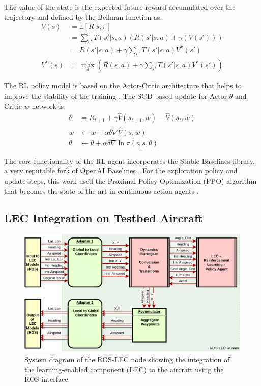 The value of the state is the expected future reward accumulated over the trajectory and defined by the Bellman function as:
\begin{align}
	V(s) &=  \mathbb{E} [R | s, \pi] \\
	&= \sum_{s'} T(s'|s,a) \left( R(s'|s,a) + \gamma ( V(s')) \right) \\
	&=  R(s'|s,a) + \gamma \sum_{s'} T(s'|s,a) V^{\pi}(s') \\
	V^{*}(s) &= \max_{a} \left( R(s,a) + \gamma \sum_{s'} T(s'|s,a) V^{*}(s') \right)
\end{align}

The RL policy model is based on the Actor-Critic architecture that helps to improve the stability of the training \cite{sutton2018reinforcement}. The SGD-based update for Actor $\theta$ and Critic $w$ network is:
\begin{align}
	\delta &=  R_{t+1} +\gamma \hat V(s_{t+1},w) - \hat V(s_t,w) \\
	w &\leftarrow w + \alpha \delta \nabla \hat V (s, w) \\
	\theta &\leftarrow \theta + \alpha \delta \nabla \ln \pi (a|s, \theta)
\end{align} 

The core functionality of the RL agent incorporates the Stable Baselines library, a very reputable fork of OpenAI Baselines \cite{hill2018stable}. For the exploration policy and update steps, this work used the Proximal Policy Optimization (PPO) algorithm that becomes the state of the art in continuous-action agents \cite{schulman2017proximal}.


\subsection{LEC Integration on Testbed Aircraft}

\begin{figure}[h]
	\centering
	\includegraphics[width=\linewidth]{figures/cp25_ros.pdf}
	\caption{System diagram of the ROS-LEC node showing the integration of the learning-enabled component (LEC) to the aircraft using the ROS interface.}
	\label{fig:integration}
\end{figure}

